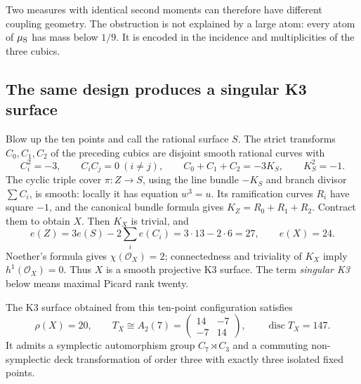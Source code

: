 Two measures with identical second moments can therefore have
different coupling geometry. The obstruction is not explained by a
large atom: every atom of \(\mu_{\rm S}\) has mass below \(1/9\).
It is encoded in the incidence and multiplicities of the three cubics.

\subsection{The same design produces a singular K3 surface}
\label{geo:k3}

Blow up the ten points and call the rational surface \(S\). The strict
transforms \(C_0,C_1,C_2\) of the preceding cubics are disjoint smooth
rational curves with
\[
 C_i^2=-3,\qquad C_iC_j=0\ (i\ne j),\qquad
 C_0+C_1+C_2=-3K_S,\qquad K_S^2=-1.
\]
The cyclic triple cover \(\pi:Z\to S\), using the line bundle
\(-K_S\) and branch divisor \(\sum C_i\), is smooth: locally it has
equation \(w^3=u\). Its ramification curves \(R_i\) have square
\(-1\), and the canonical bundle formula gives
\(K_Z=R_0+R_1+R_2\). Contract them to obtain \(X\).
Then \(K_X\) is trivial, and
\[
 e(Z)=3e(S)-2\sum_ie(C_i)=3\cdot13-2\cdot6=27,\qquad e(X)=24.
\]
Noether's formula gives \(\chi(\mathcal O_X)=2\); connectedness and
triviality of \(K_X\) imply \(h^1(\mathcal O_X)=0\).
Thus \(X\) is a smooth projective K3 surface.
The term \emph{singular K3} below means maximal Picard rank twenty.


\begin{theorem}
\label{geo:k3-lattice}
The K3 surface obtained from this ten-point configuration satisfies
\[
 \rho(X)=20,\qquad
 T_X\cong A_2(7)=
 \begin{pmatrix}14&-7\\-7&14\end{pmatrix},\qquad
 \operatorname{disc}T_X=147.
\]
It admits a symplectic automorphism group \(C_7\rtimes C_3\) and a
commuting non-symplectic deck transformation of order three with
exactly three isolated fixed points.
\end{theorem}

